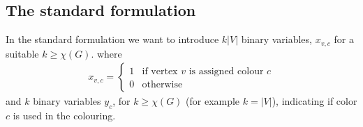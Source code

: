 \subsection{The standard formulation}
In the standard formulation we want to introduce $k|V|$ binary variables, $x_{v,c}$ for a suitable $k\geq \chi (G)$. where
\begin{align} \label{x standard}
x_{v,c} = \left\{
\begin{array}{ll}
1 & \text{if vertex }v \text{ is assigned colour } c \\ 0 & \text{otherwise}
\end{array}\right.
\end{align}
and $k$ binary variables $y_c$, for $k \geq \chi (G)$ (for example $k = |V|$), indicating if color $c$ is used in the colouring.\\
